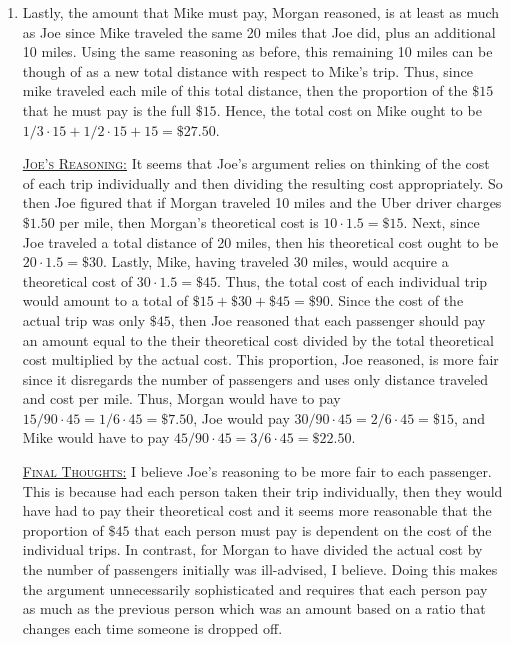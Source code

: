 \documentclass[12pt]{article}
\makeatletter
\theoremstyle{definition}
\theoremstyle{remark}
\newenvironment{solution}[1][\bf{\textit{Solution}}]{\par
  
  \normalfont \topsep6\p@\@plus6\p@\relax
  \list{}{\leftmargin=0mm
          \rightmargin=0mm
          \settowidth{\itemindent}{\itshape#1}%
          \labelwidth=\itemindent
          \parsep=0pt \listparindent=\parindent 
  }
  \item[\hskip\labelsep
        \itshape
    #1\@addpunct{.}]\ignorespaces
}{%
  \popQED\endlist\@endpefalse
}
\makeatother
\begin{document}
\begin{enumerate}[leftmargin=*]
\begin{solution}
            \hspace{4mm} Lastly, the amount that Mike must pay, Morgan reasoned, is at least as much as Joe since Mike traveled the same 20 miles that Joe did, plus an additional 10 miles. Using the same reasoning as before, this remaining 10 miles can be though of as a new total distance with respect to Mike's trip. Thus, since mike traveled each mile of this total distance, then the proportion of the $\$ 15$ that he must pay is the full $\$15$. Hence, the total cost on Mike ought to be $1/3\cdot 15+1/2\cdot15+15=\$27.50$.\par\vspace{4mm}
            
            \underline{\textsc{Joe's Reasoning:}} It seems that Joe's argument relies on thinking of the cost of each trip individually and then dividing the resulting cost appropriately. So then Joe figured that if Morgan traveled 10 miles and the Uber driver charges $\$1.50$ per mile, then Morgan's theoretical cost is $10\cdot1.5=\$15$. Next, since Joe traveled a total distance of 20 miles, then his theoretical cost ought to be $20\cdot1.5=\$30$. Lastly, Mike, having traveled 30 miles, would acquire a theoretical cost of $30\cdot 1.5=\$45$. Thus, the total cost of each individual trip would amount to a total of $\$15+\$30+\$45=\$90$. Since the cost of the actual trip was only $\$45$, then Joe reasoned that each passenger should pay an amount equal to the their theoretical cost divided by the total theoretical cost multiplied by the actual cost. This proportion, Joe reasoned, is more fair since it disregards the number of passengers and uses only distance traveled and cost per mile. Thus, Morgan would have to pay $15/90\cdot 45=1/6\cdot 45=\$7.50$, Joe would pay $30/90\cdot45=2/6\cdot45=\$15$, and Mike would have to pay $45/90\cdot 45=3/6\cdot 45=\$22.50$.\par\vspace{4mm}
            
            \underline{\textsc{Final Thoughts:}} I believe Joe's reasoning to be more fair to each passenger. This is because had each person taken their trip individually, then they would have had to pay their theoretical cost and it seems more reasonable that the proportion of $\$45$ that each person must pay is dependent on the cost of the individual trips. In contrast, for Morgan to have divided the actual cost by the number of passengers initially was ill-advised, I believe. Doing this makes the argument unnecessarily sophisticated and requires that each person pay as much as the previous person which was an amount based on a ratio that changes each time someone is dropped off.
        \end{solution}
        

\end{enumerate}
\end{document}
